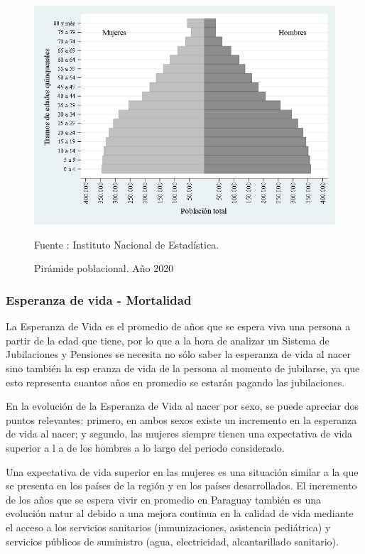\begin{figure}[H]
\begin{center}
                    \caption{Pirámide poblacional. Año 2020}
                    \includegraphics[scale=0.45]{indicadoresINE_pobtot_piramide.png}
                                    \item \footnotesize Fuente : Instituto Nacional de Estadística.
                    \end{center}
\end{figure}

\subsubsection{Esperanza de vida - Mortalidad}

La Esperanza de Vida es el promedio de años que se espera viva una
persona a partir de la edad que tiene, por lo que a la hora de analizar
un Sistema de Jubilaciones y Pensiones se necesita no sólo saber la
esperanza de vida al nacer sino también la esp eranza de vida de la
persona al momento de jubilarse, ya que esto representa cuantos años en
promedio se estarán pagando las jubilaciones.

En la evolución de la Esperanza de Vida al nacer por sexo, se puede
apreciar dos puntos relevantes: primero, en ambos sexos existe un
incremento en la esperanza de vida al nacer; y segundo, las mujeres
siempre tienen una expectativa de vida superior a l a de los hombres a
lo largo del periodo considerado.

Una expectativa de vida superior en las mujeres es una situación similar
a la que se presenta en los países de la región y en los países
desarrollados. El incremento de los años que se espera vivir en promedio
en Paraguay también es una evolución natur al debido a una mejora
continua en la calidad de vida mediante el acceso a los servicios
sanitarios (inmunizaciones, asistencia pediátrica) y servicios públicos
de suministro (agua, electricidad, alcantarillado sanitario).

